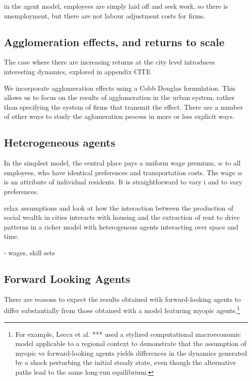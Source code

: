 in the agent model, employees are simply laid off and seek work, so there is unemployment, but there are not \glspl{labour adjustment cost} for firms.

\subsection{Agglomeration effects, and returns to scale}
The case where there are increasing returns at the city level introduces interesting dynamics, explored in appendix CITE %

We incorporate agglomeration effects using a Cobb Douglas formulation. This allows us to focus on the results of agglomeration in the urban system, rather than specifying the system of firms that transmit the effect. 
There are a number of other ways to study the aglomeration process in more or less explicit ways.



\subsection{Heterogeneous agents}
In the simplest model, the central place pays a uniform wage premium, $w$ to all employees, who have identical preferences and transportation costs. 
The wage $w$ is an attribute of individual residents.  
It is straightforward to vary i and to vary preferences. 

relax assumptions and look at how the interaction between the production of social wealth in cities interacts with housing and the extraction of rent to drive patterns in a richer model with heterogenous agents interacting over space and time. 

- wages, skill sets

\subsection{Forward Looking Agents}
There are reasons to expect the results obtained with  forward-looking agents to differ substantially from those obtained with a model featuring myopic agents.\footnote{For example, Lecca et al. *** \cite{Lecca-et-al-2013}  used a stylized computational macroeconomic model applicable to a regional context to demonstrate that the assumption of myopic vs forward-looking agents yields differences in the dynamics generated by a shock perturbing the initial steady state, even though the alternative paths lead to the same long-run equilibrium.} 

